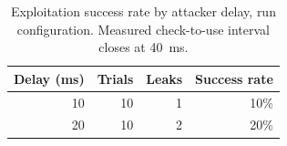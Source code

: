 \begin{table}[ht]
\centering
\begin{tabular}{rrrr}
\hline
Delay (ms) & Trials & Leaks & Success rate \\
\hline
10 & 10 & 1 & 10\% \\
20 & 10 & 2 & 20\% \\
\hline
\end{tabular}
\caption{Exploitation success rate by attacker delay, run configuration. Measured check-to-use interval closes at 40~ms.}
\label{tab:success-run}
\end{table}
